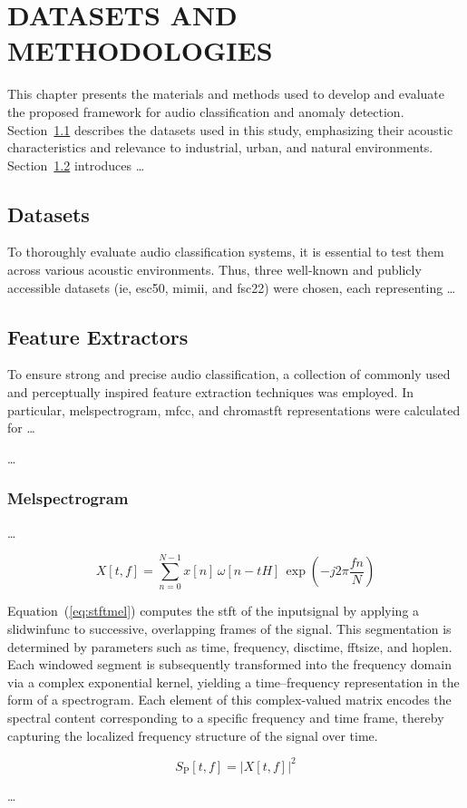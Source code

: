\section{\MakeUppercase{Datasets and Methodologies}} \label{chap:two}
This chapter presents the materials and methods used to develop and evaluate the proposed framework for audio classification and anomaly detection. Section~\ref{sec:datasets} describes the datasets used in this study, emphasizing their acoustic characteristics and relevance to industrial, urban, and natural environments. Section~\ref{sec:feature_extractors} introduces \dots
\subsection{Datasets}\label{sec:datasets}
To thoroughly evaluate audio classification systems, it is essential to test them across various acoustic environments. Thus, three well-known and publicly accessible datasets (\gls{ie}, \gls{esc50}, \gls{mimii}, and \gls{fsc22}) were chosen, each representing \dots
{}

\subsection{Feature Extractors}\label{sec:feature_extractors}
To ensure strong and precise audio classification, a collection of commonly used and perceptually inspired feature extraction techniques was employed. In particular, \gls{melspectrogram}, \gls{mfcc}, and \gls{chromastft} representations were calculated for \dots

\dots
{}
\subsubsection{Melspectrogram}
\dots

\begin{equation}
	X[t, f] = \sum_{n=0}^{N-1} x[n] \, \omega[n - tH] \, \exp\left(-j 2\pi \frac{f n}{N}\right) \label{eq:stftmel}
\end{equation}

Equation~(\ref{eq:stftmel}) computes the \gls{stft} of the \gls{inputsignal} by applying a \gls{slidwinfunc} to successive, overlapping frames of the signal. This segmentation is determined by parameters such as \gls{time}, \gls{frequency}, \gls{disctime}, \gls{fftsize}, and \gls{hoplen}. Each windowed segment is subsequently transformed into the frequency domain via a complex exponential kernel, yielding a time–frequency representation in the form of a \gls{spectrogram}. Each element of this complex-valued matrix encodes the spectral content corresponding to a specific \gls{frequency} and \gls{time} frame, thereby capturing the localized frequency structure of the signal over time.

\begin{equation}
	S_{\mathrm{P}}[t, f] = \left| X[t, f] \right|^2
	\label{eq:powerspec}
\end{equation}

\dots
